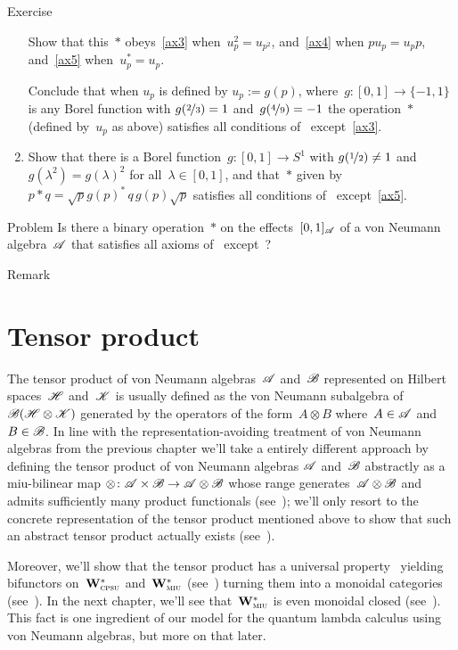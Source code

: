 \documentclass[a]{subfiles}
\begin{document}
\begin{parsec}
\begin{point}{Exercise}
\begin{enumerate}
Show that this~$\ast$ obeys~\ref{ax3} when~$u_p^2=u_{p^2}$,
and~\ref{ax4} when $pu_p=u_p p$,
and~\ref{ax5} when~$u_p^*=u_p$.

Conclude that when $u_p$ is defined by $u_p:=g(p)$,
where~$g\colon [0,1]\to\{-1,1\}$
is any Borel function with $g(\nicefrac{2}{3})=1$
and~$g(\nicefrac{4}{9})=-1$
the operation~$\ast$ (defined by~$u_p$ as above) satisfies
all conditions of~ except~\ref{ax3}.
\item
Show that there is a Borel
function~$g\colon[0,1]\to S^1$
with $g(\nicefrac{1}{2})\neq 1$
and~$g(\lambda^2)=g(\lambda)^2$ for all~$\lambda\in [0,1]$,
and that~$\ast$ given by~$p\ast q = \sqrt{p} g(p)^* \,q \,g(p)\sqrt{p}$
satisfies all conditions of~
except~\ref{ax5}.
\end{enumerate}
\end{point}
\begin{point}{Problem}%
Is there a binary operation~$\ast$
on the effects~$[0,1]_{\mathscr{A}}$
of a von Neumann algebra~$\mathscr{A}$
that satisfies all axioms of~
except~?
\end{point}
\begin{point}{Remark}%
\end{point}
\end{parsec}


\section{Tensor product}
\label{S:tensor}
\begin{parsec}%
\begin{point}%
The tensor
product of von Neumann algebras~$\mathscr{A}$
and~$\mathscr{B}$
represented on Hilbert spaces~$\mathscr{H}$ and~$\mathscr{K}$
is usually defined as the von Neumann subalgebra
of~$\mathscr{B}(\mathscr{H}\otimes\mathscr{K})$
generated by the operators
of the form~$A\otimes B$ where~$A\in\mathscr{A}$
and~$B\in\mathscr{B}$.
In line with the representation-avoiding
treatment of von Neumann algebras
from the previous chapter
we'll take a entirely different
approach
by defining the tensor product of von Neumann
algebras $\mathscr{A}$ and~$\mathscr{B}$ abstractly 
as a miu-bilinear map $\otimes\colon \mathscr{A}\times\mathscr{B}\to\mathscr{A}\otimes\mathscr{B}$
whose range generates~$\mathscr{A}\otimes\mathscr{B}$
and admits sufficiently many product functionals (see~);
we'll only resort to the concrete representation
of the tensor product  mentioned above to show that 
such an abstract tensor product actually exists (see~).

Moreover, we'll show that the tensor product has a universal
property~
yielding bifunctors on~$\mathbf{W}^*_{\text{\textsc{cpsu}}}$
and~$\mathbf{W}^*_{\text{\textsc{miu}}}$ (see~)
turning them into a monoidal categories
(see~).
In the next chapter,
we'll see that~$\mathbf{W}^*_{\text{\textsc{miu}}}$ is even
monoidal closed (see~).
This fact is one ingredient of our model for the quantum lambda calculus
using von Neumann algebras,
but more on that later.
\end{point}
\end{parsec}
\end{document}
